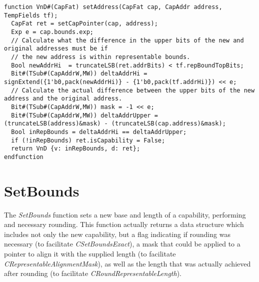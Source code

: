 \begin{lstlisting}[language=bluespec]
function VnD#(CapFat) setAddress(CapFat cap, CapAddr address, TempFields tf);
  CapFat ret = setCapPointer(cap, address);
  Exp e = cap.bounds.exp;
  // Calculate what the difference in the upper bits of the new and original addresses must be if
  // the new address is within representable bounds.
  Bool newAddrHi  = truncateLSB(ret.addrBits) < tf.repBoundTopBits;
  Bit#(TSub#(CapAddrW,MW)) deltaAddrHi = signExtend({1'b0,pack(newAddrHi)} - {1'b0,pack(tf.addrHi)}) << e;
  // Calculate the actual difference between the upper bits of the new address and the original address.
  Bit#(TSub#(CapAddrW,MW)) mask = -1 << e;
  Bit#(TSub#(CapAddrW,MW)) deltaAddrUpper = (truncateLSB(address)&mask) - (truncateLSB(cap.address)&mask);
  Bool inRepBounds = deltaAddrHi == deltaAddrUpper;
  if (!inRepBounds) ret.isCapability = False;
  return VnD {v: inRepBounds, d: ret};
endfunction
\end{lstlisting}

\section{SetBounds}
\label{sec:cheri-128-listings-setbounds}

The \emph{SetBounds} function sets a new base and length of a capability, performing
and necessary rounding.
This function actually returns a data structure which includes not only the new capability,
but a flag indicating if rounding was necessary (to facilitate \emph{CSetBoundsExact}),
a mask that could be applied to a pointer to align it with the supplied length (to facilitate \emph{CRepresentableAlignmentMask}),
as well as the length that was actually achieved after rounding (to facilitate \emph{CRoundRepresentableLength}).

